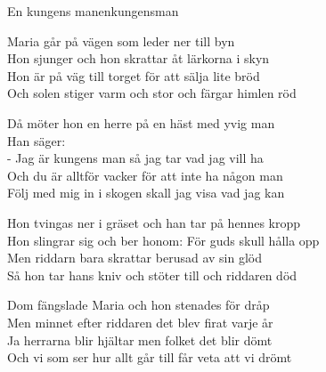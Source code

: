 \begin{song}{En kungens man}{enkungensman}
\begin{vers}
Maria går på vägen som leder ner till byn\\
Hon sjunger och hon skrattar åt lärkorna i skyn\\
Hon är på väg till torget för att sälja lite bröd\\
Och solen stiger varm och stor och färgar himlen röd\\
\end{vers}
\begin{vers}
Då möter hon en herre på en häst med yvig man\\
Han säger:\\
- Jag är kungens man så jag tar vad jag vill ha\\
Och du är alltför vacker för att inte ha någon man\\
Följ med mig in i skogen skall jag visa vad jag kan\\
\end{vers}
\begin{vers}
Hon tvingas ner i gräset och han tar på hennes kropp\\
Hon slingrar sig och ber honom: För guds skull hålla opp\\
Men riddarn bara skrattar berusad av sin glöd\\
Så hon tar hans kniv och stöter till och riddaren död\\
\end{vers}
\begin{vers}
Dom fängslade Maria och hon stenades för dråp\\
Men minnet efter riddaren det blev firat varje år\\
Ja herrarna blir hjältar men folket det blir dömt\\
Och vi som ser hur allt går till får veta att vi drömt\\
\end{vers}
\end{song}
